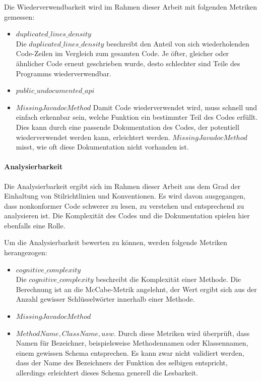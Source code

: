\documentclass[
	oneside,  %
	ngerman, 
	final, 
	11pt, 
	a4paper, 
	1.1headlines, 
	headinclude=false, 
	footinclude=false, 
	mpinclude=false, 
	pagesize, 
	onecolumn, 
	titlepage, 
	parskip=half, 
	headsepline, 
	chapterprefix=false, 
	version=first, 
	listof=totoc, 
	bibliography=totoc, 
	toc=graduated, 
	fleqn
]{scrbook}
\begin{document}
Die Wiederverwendbarkeit wird im Rahmen dieser Arbeit mit folgenden Metriken gemessen:

\begin{itemize}
	\item $duplicated\_lines\_density$\\
	Die $duplicated\_lines\_density$ beschreibt den Anteil von sich wiederholenden Code-Zeilen im Vergleich zum gesamten Code.
	Je öfter, gleicher oder ähnlicher Code erneut geschrieben wurde, desto schlechter sind Teile des Programms wiederverwendbar.
	\item $public\_undocumented\_api$ %
	\item $MissingJavadocMethod$
	Damit Code wiederverwendet wird, muss schnell und einfach erkennbar sein, welche Funktion ein bestimmter Teil des Codes erfüllt.
	Dies kann durch eine passende Dokumentation des Codes, der potentiell wiederverwendet werden kann, erleichtert werden.
	$MissingJavadocMethod$ misst, wie oft diese Dokumentation nicht vorhanden ist. 
\end{itemize}

\paragraph{Analysierbarkeit}
Die Analysierbarkeit ergibt sich im Rahmen dieser Arbeit aus dem Grad der Einhaltung von Stilrichtlinien und Konventionen.
Es wird davon ausgegangen, dass nonkonformer Code schwerer zu lesen, zu verstehen und entsprechend zu analysieren ist.
Die Komplexität des Codes und die Dokumentation spielen hier ebenfalls eine Rolle.

Um die Analysierbarkeit bewerten zu können, werden folgende Metriken herangezogen:

\begin{itemize}
	\item $cognitive\_complexity$\\
	Die $cognitive\_complexity$ beschreibt die Komplexität einer Methode.
	Die Berechnung ist an die McCabe-Metrik angelehnt, der Wert ergibt sich aus der Anzahl gewisser Schlüsselwörter innerhalb einer Methode.
	\item $MissingJavadocMethod$
	\item $MethodName, ClassName, usw.$
	Durch diese Metriken wird überprüft, dass Namen für Bezeichner, beispielsweise Methodennamen oder Klassennamen, einem gewissen Schema entsprechen.
	Es kann zwar nicht validiert werden, dass der Name des Bezeichners der Funktion des selbigen entspricht, allerdings erleichtert dieses Schema generell die Lesbarkeit.
\end{itemize}
\end{document}
